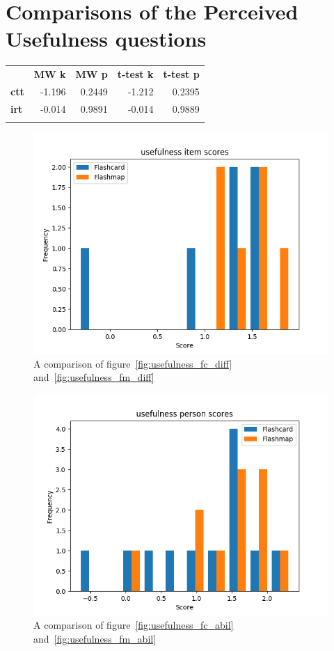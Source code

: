 \FloatBarrier
\section{Comparisons of the Perceived Usefulness questions}

\begin{longtable}[c]{@{}lrrrr@{}}
\toprule\addlinespace
& \textbf{MW k} & \textbf{MW p} &
\textbf{t-test k} & \textbf{t-test p}
\\\addlinespace
\midrule
\textbf{ctt} & -1.196 & 0.2449 & -1.212 & 0.2395
\\\addlinespace
\textbf{irt} & -0.014 & 0.9891 & -0.014 & 0.9889
\\\addlinespace
\bottomrule
    \label{tab:usefulness_comp}
\end{longtable}

\begin{figure}
    \centering
    \includegraphics[width=.7\textwidth]{img/usefulness_diff.png}
    \caption{A comparison of figure~\protect\ref{fig:usefulness_fc_diff} and~\protect\ref{fig:usefulness_fm_diff}}
    \label{fig:usefulness_diff}
\end{figure}
\begin{figure}
    \centering
    \includegraphics[width=.7\textwidth]{img/usefulness_abil.png}
    \caption{A comparison of figure~\protect\ref{fig:usefulness_fc_abil} and~\protect\ref{fig:usefulness_fm_abil}}
    \label{fig:usefulness_abil}
\end{figure}

